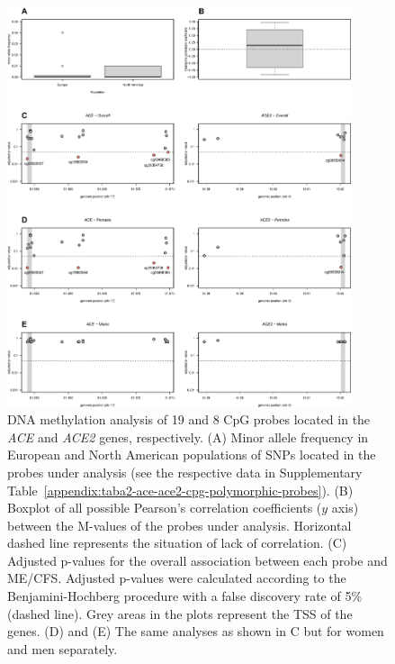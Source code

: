 \begin{figure}
    \centering\includegraphics[width=0.9\textwidth]{chapter/2021-ace-ace2/figures/fig1-dna-methylation-analysis.jpg}
    \caption[DNA methylation analysis of 19 and 8 CpG probes located in the \textit{ACE} and \textit{ACE2} genes, respectively]{DNA methylation analysis of 19 and 8 CpG probes located in the \textit{ACE} and \textit{ACE2} genes, respectively. (A) Minor allele frequency in European and North American populations of SNPs located in the probes under analysis (see the respective data in Supplementary Table~\ref{appendix:taba2-ace-ace2-cpg-polymorphic-probes}). (B) Boxplot of all possible Pearson's correlation coefficients ($y$ axis) between the M-values of the probes under analysis. Horizontal dashed line represents the situation of lack of correlation. (C) Adjusted p-values for the overall association between each probe and ME/CFS. Adjusted p-values were calculated according to the Benjamini-Hochberg procedure with a false discovery rate of 5\% (dashed line). Grey areas in the plots represent the TSS of the genes. (D) and (E) The same analyses as shown in C but for women and men separately.}
    \label{fig:dna-methylation-analysis}
\end{figure}

